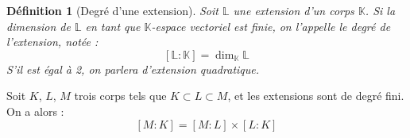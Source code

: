 \documentclass[a4paper,12pt,french,draft]{report}
\newtheorem{definition}{Définition}[section]
\begin{document}
			
			
			
			\begin{definition}[Degré d'une extension]
				Soit \(\mathbb{L}\) une extension d'un corps \(\mathbb{K}\). Si la dimension de \(\mathbb{L}\) en tant que \(\mathbb{K}\)-espace vectoriel est finie, on l'appelle le \emph{degré} de l'extension, notée :
				\[
				[\mathbb{L}:\mathbb{K}] = \dim_\mathbb{K}\mathbb{L}
				\]
				S'il est égal à 2, on parlera d'\emph{extension quadratique}.
			\end{definition}
			
			\begin{proposition}
				Soit \(K\), \(L\), \(M\) trois corps tels que \( K \subset L \subset M\), et les extensions sont de degré fini. On a alors :
				\[
				[M:K] = [M:L]{\times} [L:K]
				\]
			\end{proposition}
\end{document}
